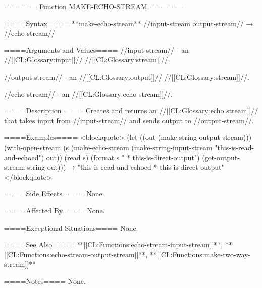 ====== Function MAKE-ECHO-STREAM ======

====Syntax====
**make-echo-stream** //input-stream output-stream// → //echo-stream//

====Arguments and Values====
//input-stream// - an //[[CL:Glossary:input]]// //[[CL:Glossary:stream]]//.

//output-stream// - an //[[CL:Glossary:output]]// //[[CL:Glossary:stream]]//.

//echo-stream// - an //[[CL:Glossary:echo stream]]//.

====Description====
Creates and returns an //[[CL:Glossary:echo stream]]// that takes input from //input-stream// and sends output to //output-stream//.

====Examples==== <blockquote> (let ((out (make-string-output-stream))) (with-open-stream (s (make-echo-stream (make-string-input-stream "this-is-read-and-echoed") out)) (read s) (format s " * this-is-direct-output") (get-output-stream-string out))) → "this-is-read-and-echoed * this-is-direct-output" </blockquote>

====Side Effects====
None.

====Affected By====
None.

====Exceptional Situations====
None.

====See Also====
**[[CL:Functions:echo-stream-input-stream]]**, **[[CL:Functions:echo-stream-output-stream]]**, **[[CL:Functions:make-two-way-stream]]**

====Notes====
None.

